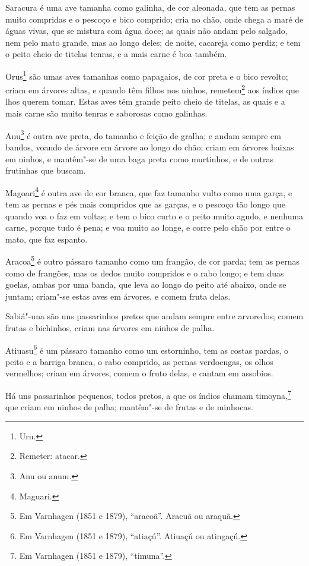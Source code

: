 \begin{linenumbers}
Saracura é uma ave tamanha como galinha, de cor aleonada, que tem as pernas muito
compridas e o pescoço e bico comprido; cria no chão, onde chega a maré de águas vivas, que
se mistura com água doce; as quais não andam pelo salgado, nem pelo mato grande, mas ao
longo deles; de noite, cacareja como perdiz; e tem o peito cheio de titelas tenras, e a
mais carne é boa também.

Orus\footnote{ Uru.} são umas aves tamanhas como papagaios, de cor preta e o bico revolto;
criam em árvores altas, e quando têm filhos nos ninhos, remetem\footnote{ Remeter:
atacar.} aos índios que lhos querem tomar. Estas aves têm grande peito cheio de
titelas, as quais e a mais carne são muito tenras e saborosas como galinhas.

Anu\footnote{ Anu ou anum.} é outra ave preta, do tamanho e feição de gralha; e andam
sempre em bandos, voando de árvore em árvore ao longo do chão; criam em árvores baixas em
ninhos, e mantêm"-se de uma baga preta como murtinhos, e de outras frutinhas que buscam.

Magoari\footnote{ Maguari.} é outra ave de cor branca, que faz tamanho vulto como uma
garça, e tem as pernas e pés mais compridos que as garças, e o pescoço tão longo que
quando voa o faz em voltas; e tem o bico curto e o peito muito agudo, e nenhuma carne,
porque tudo é pena; e voa muito ao longe, e corre pelo chão por entre o mato, que faz
espanto.

Aracoa\footnote{ Em Varnhagen (1851 e 1879), ``aracoã''. Aracuã ou araquã.} é outro
pássaro tamanho como um frangão, de cor parda; tem as pernas como de frangões, mas os
dedos muito compridos e o rabo longo; e tem duas goelas, ambas por uma banda, que leva ao
longo do peito até abaixo, onde se juntam; criam"-se estas aves em árvores, e comem fruta
delas.

Sabiá"-una são uns passarinhos pretos que andam sempre entre arvoredos; comem frutas e
bichinhos, criam nas árvores em ninhos de palha.

Atiuasu\footnote{ Em Varnhagen (1851 e 1879), ``atiaçú''. Atiuaçú ou atingaçú.} é um
pássaro tamanho como um estorninho, tem as costas pardas, o peito e a barriga branca, o
rabo comprido, as pernas verdoengas, os olhos vermelhos; criam em árvores, comem o fruto
delas, e cantam em assobios.

Há uns passarinhos pequenos, todos pretos, a que os índios chamam timoyna,\footnote{ Em
Varnhagen (1851 e 1879), ``timuna''.} que criam em ninhos de palha; mantêm"-se de frutas e
de minhocas.


\end{linenumbers}
